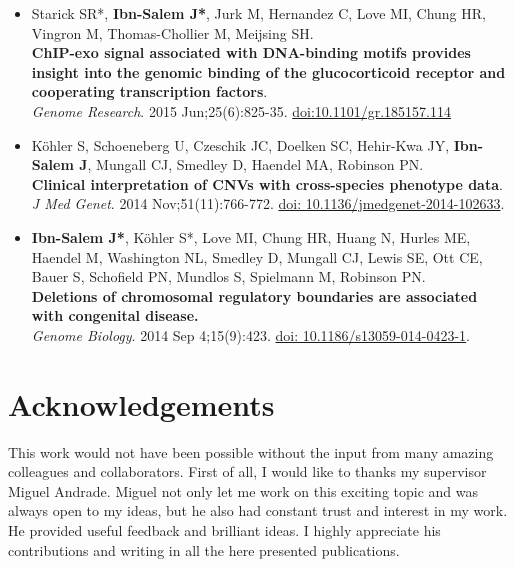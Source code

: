 \documentclass[a4paper,twoside=true,openright,parskip=full,chapterprefix=true,11pt,headings=normal,bibliography=totoc,listof=totoc,titlepage=on,captions=tableabove,draft=false]{scrreprt}
\theoremstyle{definition}
\theoremstyle{definition}
\theoremstyle{definition}
\theoremstyle{remark}
\begin{document}
\begin{itemize}
{  in sea urchins.}\\
  \emph{Development}. 2016 Jan 11.
  \href{https://doi.org/10.1242/dev.129312}{doi: 10.1242/dev.129312} ~\\
\item
  Starick SR*, \textbf{Ibn-Salem J*}, Jurk M, Hernandez C, Love MI,
  Chung HR, Vingron M, Thomas-Chollier M, Meijsing SH.\\
  \textbf{ChIP-exo signal associated with DNA-binding motifs provides
  insight into the genomic binding of the glucocorticoid receptor and
  cooperating transcription factors}.\\
  \emph{Genome Research}. 2015 Jun;25(6):825-35.
  \href{https://doi.org/10.1101/gr.185157.114}{doi:10.1101/gr.185157.114}
\item
  Köhler S, Schoeneberg U, Czeschik JC, Doelken SC, Hehir-Kwa JY,
  \textbf{Ibn-Salem J}, Mungall CJ, Smedley D, Haendel MA, Robinson
  PN.\\
  \textbf{Clinical interpretation of CNVs with cross-species phenotype
  data}.\\
  \emph{J Med Genet}. 2014 Nov;51(11):766-772.
  \href{https://doi.org/10.1136/jmedgenet-2014-102633}{doi:
  10.1136/jmedgenet-2014-102633}.
\item
  \textbf{Ibn-Salem J*}, Köhler S*, Love MI, Chung HR, Huang N, Hurles
  ME, Haendel M, Washington NL, Smedley D, Mungall CJ, Lewis SE, Ott CE,
  Bauer S, Schofield PN, Mundlos S, Spielmann M, Robinson PN.\\
  \textbf{Deletions of chromosomal regulatory boundaries are associated
  with congenital disease.}\\
  \emph{Genome Biology}. 2014 Sep 4;15(9):423.
  \href{https://doi.org/10.1186/s13059-014-0423-1}{doi:
  10.1186/s13059-014-0423-1}.
\end{itemize}

\hypertarget{acknowledgements-2}{%
\chapter*{Acknowledgements}\label{acknowledgements-2}}

This work would not have been possible without the input from many
amazing colleagues and collaborators. First of all, I would like to
thanks my supervisor Miguel Andrade. Miguel not only let me work on this
exciting topic and was always open to my ideas, but he also had constant
trust and interest in my work. He provided useful feedback and brilliant
ideas. I highly appreciate his contributions and writing in all the here
presented publications.
\end{document}
